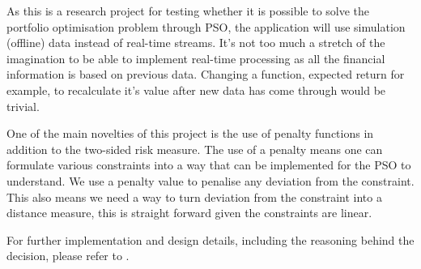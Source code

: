   As this is a research project for testing whether it is possible to solve the portfolio optimisation problem through PSO, the application will use simulation (offline) data instead of real-time streams. It's not too much a stretch of the imagination to be able to implement real-time processing as all the financial information is based on previous data. Changing a function, expected return for example, to recalculate it's value after new data has come through would be trivial. 

  One of the main novelties of this project is the use of penalty functions in addition to the two-sided risk measure. The use of a penalty means one can formulate various constraints into a way that can be implemented for the PSO to understand. We use a penalty value to penalise any deviation from the constraint. This also means we need a way to turn deviation from the constraint into a distance measure, this is straight forward given the constraints are linear. 

  For further implementation and design details, including the reasoning behind the decision, please refer to .

